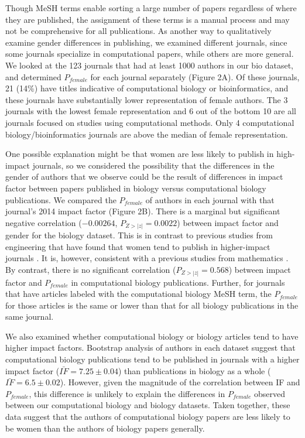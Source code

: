 \documentclass[10pt,letterpaper]{article}
\begin{document}
\begin{flushleft}
Though MeSH terms enable sorting a large number of papers regardless of where they are published, the assignment of these terms is a manual process and may not be comprehensive for all publications. As another way to qualitatively examine gender differences in publishing, we examined different journals, since some journals specialize in computational papers, while others are more general. We looked at the 123  journals that had at least 1000 authors in our bio dataset, and determined $P_{female}$ for each journal separately (Figure 2A). Of these journals, 21 (14\%) have titles indicative of computational biology or bioinformatics, and these journals have substantially lower representation of female authors. The 3 journals with the lowest female representation and 6 out of the bottom 10 are all journals focused on studies using computational methods. Only 4 computational biology/bioinformatics journals are above the median of female representation.

One possible explanation might be that women are less likely to publish in high-impact journals, so we considered the possibility that the differences in the gender of authors that we observe could be the result of differences in impact factor between papers published in biology versus computational biology publications. We compared the $P_{female}$ of authors in each journal with that journal’s 2014 impact factor (Figure 2B). There is a marginal but significant negative correlation ($-0.00264$, $P_{Z > |z|} = 0.0022$) between impact factor and gender for the biology dataset. This is in contrast to previous studies from engineering that have found that women tend to publish in higher-impact journals \cite{Ghiasi2015}. It is, however, consistent with a previous studies from mathematics . By contrast, there is no significant correlation ($P_{Z > |z|} = 0.568$) between impact factor and $P_{female}$ in computational biology publications. Further, for journals that have articles labeled with the computational biology MeSH term, the $P_{female}$ for those articles is the same or lower than that for all biology publications in the same journal.

We also examined whether computational biology or biology articles tend to have higher impact factors. Bootstrap analysis of authors in each dataset suggest that computational biology publications tend to be published in journals with a higher impact factor ($\bar{IF} = 7.25 \pm 0.04$) than publications in biology as a whole ($\bar{IF} = 6.5 \pm 0.02$). However, given the magnitude of the correlation between IF and $P_{female}$, this difference is unlikely to explain the differences in $P_{female}$ observed between our computational biology and biology datasets. Taken together, these data suggest that the authors of computational biology papers are less likely to be women than the authors of biology papers generally.


\end{flushleft}
\end{document}
